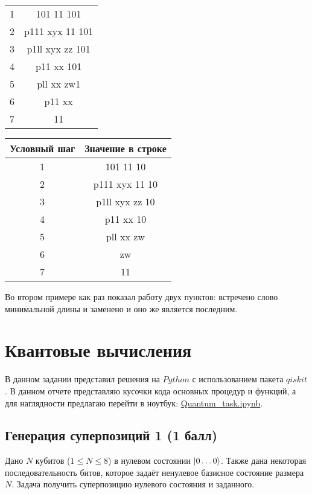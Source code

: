 \documentclass{article}
\begin{document}
\begin{enumerate}
\begin{center}
\begin{tabular}{c|c}
        1   & 101 11 101        \\
        2   & p111 xyx 11 101   \\
        3   & p1ll xyx zz 101   \\
        4   & p11 xx 101        \\
        5   & pll xx zw1        \\
        6   & p11 xx            \\
        7   & 11                \\
    \end{tabular} 
    \begin{tabular}{c|c}
        Условный шаг    & Значение в строке     \\ \hline
        1   & 101 11 10         \\
        2   & p111 xyx 11 10    \\
        3   & p1ll xyx zz 10    \\
        4   & p11 xx 10         \\
        5   & pll xx zw         \\
        6   & zw                \\
        7   & 11                \\
    \end{tabular} 
    \end{center}
    Во втором примере как раз показал работу двух пунктов: встречено слово минимальной длины и заменено и оно же является последним. 
\end{enumerate}
\newpage

\section{Квантовые вычисления}
В данном задании представил решения на $Python$ с использованием пакета $qiskit$. В данном отчете представляю кусочки кода основных процедур и функций, а для наглядности предлагаю перейти в ноутбук: \href{https://github.com/NMPEI-IMAI/tm-and-qc-s3tout/blob/main/Quantum_task.ipynb}{Quantum\_task.ipynb}.
\subsection{Генерация суперпозиций 1 (1 балл)}

Дано $N$ кубитов ($1 \le N \le 8$) в нулевом состоянии $\Ket{0\dots0}$. Также дана некоторая последовательность битов, которое задаёт ненулевое базисное состояние размера $N$. Задача получить суперпозицию нулевого состояния и заданного.
\end{document}
